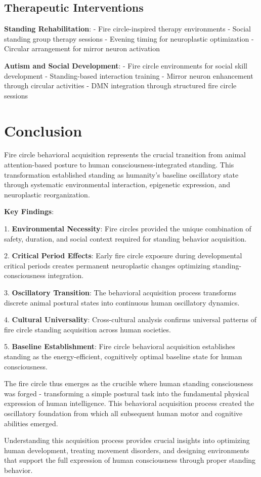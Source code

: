 \documentclass[12pt]{article}
\begin{document}
\subsection{Therapeutic Interventions}

\textbf{Standing Rehabilitation}:
- Fire circle-inspired therapy environments
- Social standing group therapy sessions
- Evening timing for neuroplastic optimization
- Circular arrangement for mirror neuron activation

\textbf{Autism and Social Development}:
- Fire circle environments for social skill development
- Standing-based interaction training
- Mirror neuron enhancement through circular activities
- DMN integration through structured fire circle sessions

\section{Conclusion}

Fire circle behavioral acquisition represents the crucial transition from animal attention-based posture to human consciousness-integrated standing. This transformation established standing as humanity's baseline oscillatory state through systematic environmental interaction, epigenetic expression, and neuroplastic reorganization.

\textbf{Key Findings}:

1. \textbf{Environmental Necessity}: Fire circles provided the unique combination of safety, duration, and social context required for standing behavior acquisition.

2. \textbf{Critical Period Effects}: Early fire circle exposure during developmental critical periods creates permanent neuroplastic changes optimizing standing-consciousness integration.

3. \textbf{Oscillatory Transition}: The behavioral acquisition process transforms discrete animal postural states into continuous human oscillatory dynamics.

4. \textbf{Cultural Universality}: Cross-cultural analysis confirms universal patterns of fire circle standing acquisition across human societies.

5. \textbf{Baseline Establishment}: Fire circle behavioral acquisition establishes standing as the energy-efficient, cognitively optimal baseline state for human consciousness.

The fire circle thus emerges as the crucible where human standing consciousness was forged - transforming a simple postural task into the fundamental physical expression of human intelligence. This behavioral acquisition process created the oscillatory foundation from which all subsequent human motor and cognitive abilities emerged.

Understanding this acquisition process provides crucial insights into optimizing human development, treating movement disorders, and designing environments that support the full expression of human consciousness through proper standing behavior.



\end{document}
